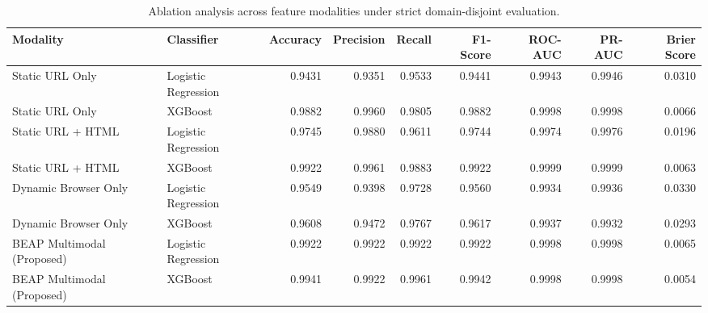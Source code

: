\begin{table}
\caption{Ablation analysis across feature modalities under strict domain-disjoint evaluation.}
\label{tab:ablation}
\begin{tabular}{llrrrrrrr}
\toprule
Modality & Classifier & Accuracy & Precision & Recall & F1-Score & ROC-AUC & PR-AUC & Brier Score \\
\midrule
Static URL Only & Logistic Regression & 0.9431 & 0.9351 & 0.9533 & 0.9441 & 0.9943 & 0.9946 & 0.0310 \\
Static URL Only & XGBoost & 0.9882 & 0.9960 & 0.9805 & 0.9882 & 0.9998 & 0.9998 & 0.0066 \\
Static URL + HTML & Logistic Regression & 0.9745 & 0.9880 & 0.9611 & 0.9744 & 0.9974 & 0.9976 & 0.0196 \\
Static URL + HTML & XGBoost & 0.9922 & 0.9961 & 0.9883 & 0.9922 & 0.9999 & 0.9999 & 0.0063 \\
Dynamic Browser Only & Logistic Regression & 0.9549 & 0.9398 & 0.9728 & 0.9560 & 0.9934 & 0.9936 & 0.0330 \\
Dynamic Browser Only & XGBoost & 0.9608 & 0.9472 & 0.9767 & 0.9617 & 0.9937 & 0.9932 & 0.0293 \\
BEAP Multimodal (Proposed) & Logistic Regression & 0.9922 & 0.9922 & 0.9922 & 0.9922 & 0.9998 & 0.9998 & 0.0065 \\
BEAP Multimodal (Proposed) & XGBoost & 0.9941 & 0.9922 & 0.9961 & 0.9942 & 0.9998 & 0.9998 & 0.0054 \\
\bottomrule
\end{tabular}
\end{table}
